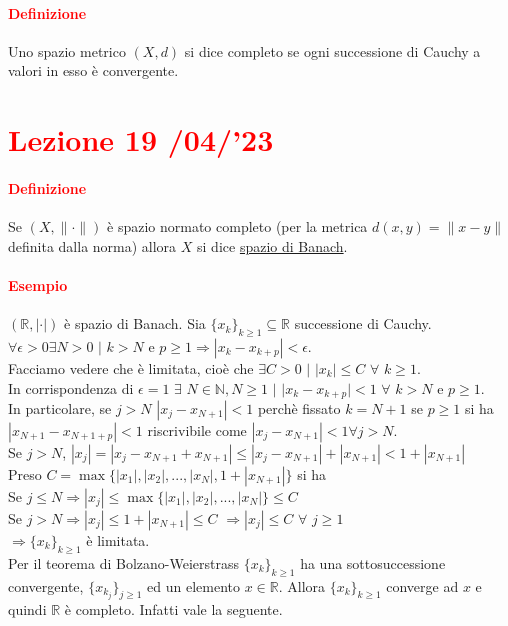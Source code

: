 \documentclass{article}
\newcommand{\R}{\mathbb{R}}
\newcommand{\N}{\mathbb{N}}
\begin{document}
\paragraph{\textcolor{red}{Definizione}}
Uno spazio metrico $(X,d)$ si dice completo se ogni successione di Cauchy a valori in esso è convergente.

\newpage
\section{\textcolor{red}{Lezione 19 \space{}/04/'23}}
\paragraph{\textcolor{red}{Definizione}}
Se $(X, \|\cdot  \|)$ è spazio normato completo (per la metrica $d(x,y)=\|x-y\|$ definita dalla norma) allora $X$ si dice \underline{spazio di Banach}.

\paragraph{\textcolor{red}{Esempio}}
$(\R,|\cdot|)$ è spazio di Banach. Sia $\{x_k\}_{k\geq 1}\subseteq \R$ successione di Cauchy.\\
$\forall \epsilon >0 \exists N > 0 \,\,| \,\, k >N$ e $p \geq 1 \Rightarrow |x_k-x_{k+p}|< \epsilon$.\\
Facciamo vedere che è limitata, cioè che $\exists C >0 \,\,|\,\, |x_k| \leq C\,\, \forall \,\, k \geq 1$.\\
In corrispondenza di $\epsilon = 1 \,\, \exists \,\, N \in \N, N \geq 1 \,\,| \,\, |x_k-x_{k+p}|< 1 \,\,\forall \,\, k >N$ e $p \geq 1$.\\
In particolare, se $j >N$ $|x_j-x_{N+1}|<1$ perchè fissato $k = N+1$ se $p \geq 1$ si ha $|x_{N+1}-x_{N+1+p}|< 1$ riscrivibile come $|x_j-x_{N+1}|<1 \forall j >N$.\\
Se $j >N$, $|x_j|=|x_j-x_{N+1}+x_{N+1}|\leq |x_j-x_{N+1}|+|x_{N+1}|< 1 +|x_{N+1}|$\\
Preso $C= \max\{|x_1|,|x_2|,..., |x_N|,1+|x_{N+1}|\}$ si ha\\
Se $j \leq N \Rightarrow |x_j|\leq \max\{|x_1|,|x_2|,...,|x_N|\}\leq C$\\
Se $j > N \Rightarrow |x_j| \leq 1+|x_{N+1}|\leq C$
$\Rightarrow |x_j|\leq C \,\,\forall \,\, j \geq 1$\\
$\Rightarrow \{x_k\}_{k \geq 1}$ è limitata.\\
Per il teorema di Bolzano-Weierstrass $\{x_k\}_{k \geq1}$ ha una sottosuccessione convergente, $\{x_{k_j}\}_{j \geq 1}$ ed un elemento $x \in \R$. Allora $\{x_k\}_{k \geq1}$ converge ad $x$ e quindi $\R$ è completo. Infatti vale la seguente.
\end{document}
